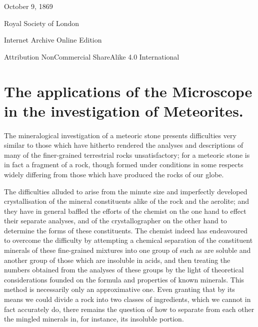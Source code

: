 \documentclass[a4paper, 12pt, oneside]{article}
\begin{document}
\begin{titlepage}
	\vspace*{\fill}%
	
	October 9, 1869 %
	
	{\small Royal Society of London} %

	\vspace{1\baselineskip} %

    Internet Archive Online Edition  %
	
	{\small Attribution NonCommercial ShareAlike 4.0 International } %
\end{titlepage}
\setlength{\parskip}{1mm plus1mm minus1mm}
\setcounter{tocdepth}{3}
\setcounter{secnumdepth}{3}
\tableofcontents
\clearpage
\section{The applications of the Microscope in the investigation of Meteorites.}
\paragraph{}
The mineralogical investigation of a meteoric stone presents difficulties very similar to those which have hitherto rendered the analyses and descriptions of many of the finer-grained terrestrial rocks unsatisfactory; for a meteoric stone is in fact a fragment of a rock, though formed under conditions in some respects widely differing from those which have produced the rocks of our globe.

The difficulties alluded to arise from the minute size and imperfectly developed crystallisation of the mineral constituents alike of the rock and the aerolite; and they have in general baffled the efforts of the chemist on the one hand to effect their separate analyses, and of the crystallographer on the other hand to determine the forms of these constituents. The chemist indeed has endeavoured to overcome the difficulty by attempting a chemical separation of the constituent minerals of these fine-grained mixtures into one group of such as are soluble and another group of those which are insoluble in acids, and then treating the numbers obtained from the analyses of these groups by the light of theoretical considerations founded on the formula and properties of known minerals. This method is necessarily only an approximative one. Even granting that by its means we could divide a rock into two classes of ingredients, which we cannot in fact accurately do, there remains the question of how to separate from each other the mingled minerals in, for instance, its insoluble portion.
\end{document}
